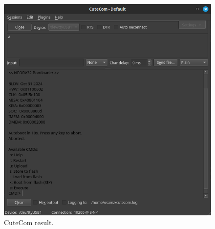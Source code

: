 \begin{figure}[H]
    \centering
    \includegraphics[width=150mm]{figures/res.png}
    \caption{CuteCom result.}
    \label{fig:cute}
\end{figure}
